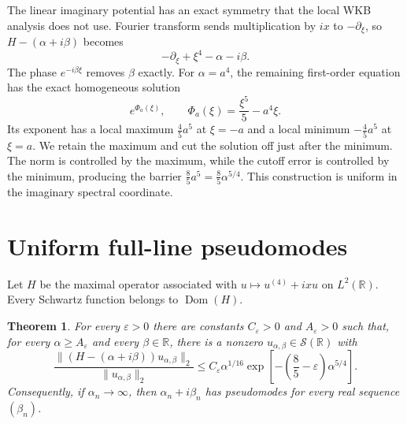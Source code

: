 \documentclass[11pt]{article}
\newtheorem{theorem}{Theorem}
\newcommand{\R}{\mathbb R}
\newcommand{\Dom}{\operatorname{Dom}}
\begin{document}
The linear imaginary potential has an exact symmetry that the local WKB
analysis does not use.  Fourier transform sends multiplication by $ix$ to
$-\partial_\xi$, so $H-(\alpha+i\beta)$ becomes
\[
             -\partial_\xi+\xi^4-\alpha-i\beta.
\]
The phase $e^{-i\beta\xi}$ removes $\beta$ exactly.  For
$\alpha=a^4$, the remaining first-order equation has the exact homogeneous
solution
\[
                  e^{\Phi_a(\xi)},\qquad
                  \Phi_a(\xi)=\frac{\xi^5}{5}-a^4\xi.
\]
Its exponent has a local maximum $\frac45a^5$ at $\xi=-a$ and a local
minimum $-\frac45a^5$ at $\xi=a$.  We retain the maximum and cut the solution
off just after the minimum.  The norm is controlled by the maximum, while the
cutoff error is controlled by the minimum, producing the barrier
$\frac85a^5=\frac85\alpha^{5/4}$.  This construction is uniform in the
imaginary spectral coordinate.

\section{Uniform full-line pseudomodes}

Let $H$ be the maximal operator associated with $u\mapsto u^{(4)}+ixu$ on
$L^2(\R)$.  Every Schwartz function belongs to $\Dom(H)$.

\begin{theorem}\label{thm:main}
For every $\varepsilon>0$ there are constants $C_\varepsilon>0$ and
$A_\varepsilon>0$ such that, for every $\alpha\ge A_\varepsilon$ and every
$\beta\in\R$, there is a nonzero $u_{\alpha,\beta}\in\mathcal S(\R)$ with
\begin{equation}\label{eq:residual}
 \frac{\|(H-(\alpha+i\beta))u_{\alpha,\beta}\|_2}
      {\|u_{\alpha,\beta}\|_2}
 \le C_\varepsilon\alpha^{1/16}
 \exp\!\left[-\left(\frac85-\varepsilon\right)\alpha^{5/4}\right].
\end{equation}
Consequently, if $\alpha_n\to\infty$, then
$\alpha_n+i\beta_n$ has pseudomodes for every real sequence $(\beta_n)$.
\end{theorem}
\end{document}
